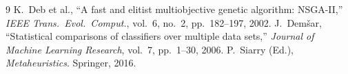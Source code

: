 \documentclass[aspectratio=169,10pt]{beamer}
\begin{document}
\begin{thebibliography}{9}
K.\ Deb et al., ``A fast and elitist multiobjective genetic algorithm: NSGA-II,''
\textit{IEEE Trans.\ Evol.\ Comput.}, vol.\ 6, no.\ 2, pp.\ 182--197, 2002.
J.\ Dem\v{s}ar, ``Statistical comparisons of classifiers over multiple data sets,''
\textit{Journal of Machine Learning Research}, vol.\ 7, pp.\ 1--30, 2006.
P.\ Siarry (Ed.), \textit{Metaheuristics}. Springer, 2016.
\end{thebibliography}
\end{document}
